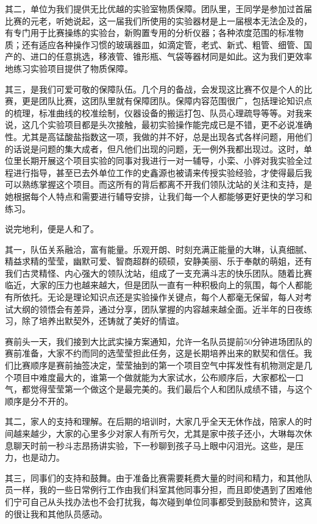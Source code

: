 \documentclass[]{book}
\begin{document}
其二，单位为我们提供无比优越的实验室物质保障。团队里，王同学是参加过首届比赛的元老，听她说起，这一届我们所使用的实验器材是上一届根本无法企及的，有专门用于比赛操练的实验台，新购置专用的分析仪器；各种浓度范围的标准物质；还有适应各种操作习惯的玻璃器皿，如滴定管，老式、新式、粗管、细管、国产的、进口的任意挑选，移液管、锥形瓶、气袋等器材同是如此。这为我们更效率地练习实验项目提供了物质保障。

其三，是我们可爱可敬的保障队伍。几个月的备战，会发现这比赛不仅是个人的比赛，更是团队比赛，这团队里就有保障团队。保障内容范围很广，包括理论知识点的梳理，标准曲线的校准绘制，仪器设备的搬运打包、队员心理疏导等等。对我来说，这几个实验项目都是头次接触，最初实验操作能完成已是不错，更不必说准确性。尤其是高锰酸盐指数这一项，我做的并不好，总是出现各式各样问题，用他们的话说是问题的集大成者，但凡他们出现的问题，无一例外我都出现过。这时，单位里长期开展这个项目实验的同事对我进行一对一辅导，小栾、小骅对我实验全过程进行指导，甚至已去外单位工作的史鑫源也被请来传授实验经验，才使得最后我可以熟练掌握这个项目。而这所有的背后都离不开我们领队沈站的关注和支持，是她根据每个人特点和需要进行辅导安排，让我们每一个人都能够更好更快的学习和练习。

说完地利，便是人和了。

其一，队伍关系融洽，富有能量。乐观开朗、时刻充满正能量的大琳，认真细腻、精益求精的莹莹，幽默可爱、智商超群的硕硕，安静美丽、乐于奉献的萌姐，还有我们古灵精怪、内心强大的领队沈站，组成了一支充满斗志的快乐团队。随着比赛临近，大家的压力也越来越大，但是团队一直有一种积极向上的氛围，每个人都能有所依托。无论是理论知识点还是实验操作关键点，每个人都毫无保留，每人对考试大纲的领悟会有差异，通过分享，团队掌握的内容越来越全面。近半年的日夜练习，除了培养出默契外，还铸就了美好的情谊。

赛前头一天，我们接到大比武实操方案通知，允许一名队员提前50分钟进场团队的赛前准备，大家不约而同的选莹莹担此任务，这是长期培养出来的默契和信任。我们比赛顺序是赛前抽签决定，莹莹抽到的第一个项目空气中挥发性有机物测定是几个项目中难度最大的，谁第一个做就能为大家试水，公布顺序后，大家都松一口气，都觉得莹莹第一个做这个是最完美的。我们最后个人和团队成绩不错，与这个顺序是分不开的。

其二，家人的支持和理解。在后期的培训时，大家几乎全天无休作战，陪家人的时间越来越少，大家的心里多少对家人有所亏欠，尤其是家中孩子还小，大琳每次休息聊天时前一秒斗志昂扬讲实验，下一秒聊到孩子马上眼中闪泪光。这些，是压力，也是动力。

其三，同事们的支持和鼓舞。由于准备比赛需要耗费大量的时间和精力，和其他队员一样，我的一些日常例行工作由我们科室其他同事分担，而且即使遇到了困难他们宁可自己从头找办法也不会打扰我，每次碰到单位同事都受到鼓励和赞许，这真的很让我和其他队员感动。
\end{document}

